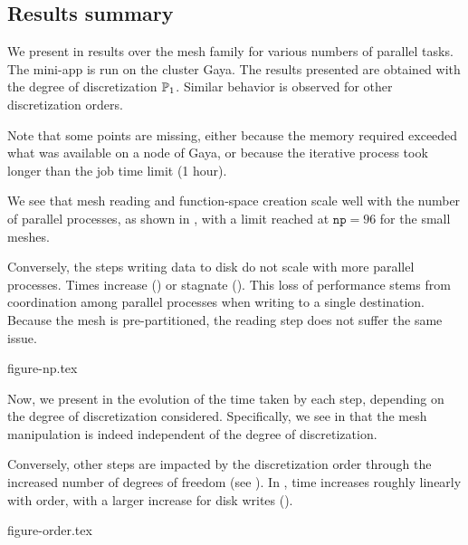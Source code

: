 
\subsection{Results summary}



We present in  results over the mesh family for various numbers of parallel tasks.
The mini-app is run on the cluster Gaya.
The results presented are obtained with the degree of discretization $\mathbb{P}_1$.
Similar behavior is observed for other discretization orders.

Note that some points are missing, either because the memory required exceeded what was available on a node of Gaya, or because the iterative process took longer than the job time limit (1 hour).

We see that mesh reading and function-space creation scale well with the number of parallel processes, as shown in , with a limit reached at $\texttt{np}=96$ for the small meshes.

Conversely, the steps writing data to disk do not scale with more parallel processes.
Times increase () or stagnate ().
This loss of performance stems from coordination among parallel processes when writing to a single destination.
Because the mesh is pre-partitioned, the reading step does not suffer the same issue.

{figure-np.tex}


\vspace{\baselineskip}

Now, we present in  the evolution of the time taken by each step, depending on the degree of discretization considered.
Specifically, we see in  that the mesh manipulation is indeed independent of the degree of discretization.

Conversely, other steps are impacted by the discretization order through the increased number of degrees of freedom (see ).
In , time increases roughly linearly with order, with a larger increase for disk writes ().

{figure-order.tex}

